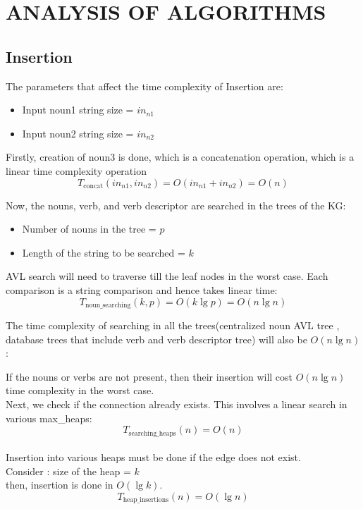 \documentclass[conference]{IEEEtran}
\begin{document}
\section{ANALYSIS OF ALGORITHMS}
\subsection{\textbf{Insertion}}
The parameters that affect the time complexity of Insertion are:
\begin{itemize}
    \item Input noun1 string size = $in_{n1}$
    \item Input noun2 string size = $in_{n2}$
\end{itemize}

Firstly, creation of noun3 is done, which is a concatenation operation, which is a linear time complexity operation
\\
\begin{equation}
	T_{\text{concat}}(in_{n1}, in_{n2}) = O(in_{n1} + in_{n2}) = O(n)
\end{equation}

Now, the nouns, verb, and verb descriptor are searched in the trees of the KG:
\begin{itemize}
    \item Number of nouns in the tree = $p$
    \item Length of the string to be searched = $k$
\end{itemize}
AVL search will need to traverse till the leaf nodes in the worst case. Each comparison is a string comparison and hence takes linear time:
\begin{equation}
	T_{\text{noun\_searching}}(k, p) = O(k \lg p) = O(n \lg n)
\end{equation}

The time complexity of searching in all the trees(centralized noun AVL tree , database trees that include verb and verb descriptor tree) will also be $O(n \lg n)$:

If the nouns or verbs are not present, then their insertion  will cost $O(n \lg n)$ time complexity in the worst case.
\\
Next, we check if the connection already exists. This involves a linear search in various max\_heaps:
\begin{equation}
	T_{\text{searching\_heaps}}(n) = O(n)
\end{equation}
\\
Insertion into various heaps must be done if the edge does not exist. \\Consider : size of the heap = $k$
\\then, insertion is done in $O(\lg k)$.
\\
\begin{equation}
	T_{\text{heap\_insertions}}(n) = O(\lg n)
\end{equation}
\end{document}
